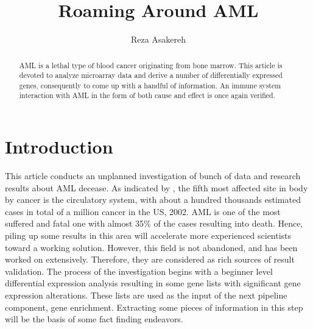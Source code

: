 \documentclass[3p,authoryear,preprint,12pt]{elsarticle}
\begin{document}
\begin{frontmatter}
	
\title{Roaming Around AML
}
    
\author[abb6a21433054]{Reza Asakereh}
    
\address[abb6a21433054]{CE Department\unskip, 
    Sharif University of Technology}
  

\begin{abstract}
 AML is a lethal type of blood cancer originating from bone marrow. This article is devoted to analyze microarray data and derive a number of differentially expressed genes, consequently to come up with a handful of information. An immune system interaction with AML in the form of both cause and effect is once again verified. 
\end{abstract}
\end{frontmatter}
    
\section{Introduction}
 This article conducts an unplanned investigation of bunch of data and research results about AML decease. As indicated by \cite{doi:10.3322/canjclin.55.2.74}, the fifth most affected site in body by cancer is the circulatory system, with about a hundred thousands estimated cases in total of a million cancer in the US, 2002. AML is one of the most suffered and fatal one with almost 35\% of the cases resulting into death. Hence, piling up some results in this area will accelerate more experienced scientists toward a working solution. However, this field is not abandoned, and has been worked on extensively. Therefore, they are considered as rich sources of result validation. The process of the investigation begins with a beginner level differential expression analysis resulting in some gene lists with significant gene expression alterations. These lists are used as the input of the next pipeline component, gene enrichment. Extracting some pieces of information in this step will be the basis of some fact finding endeavors.
\end{document}
